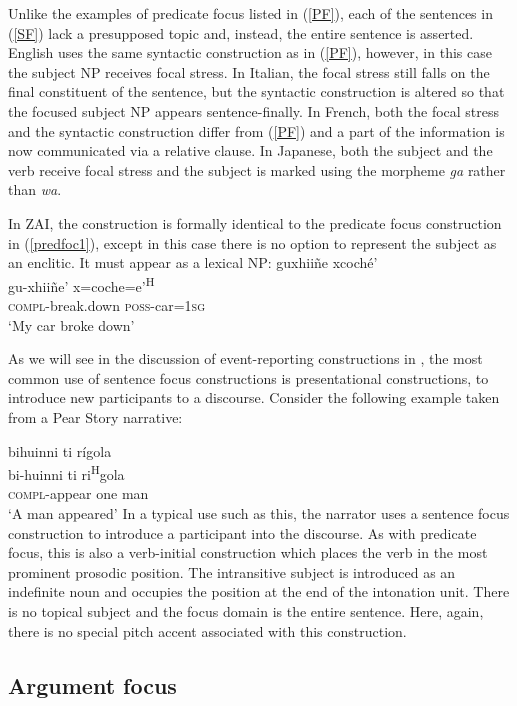 Unlike the examples of predicate focus listed in (\ref{PF}), each of the sentences in (\ref{SF}) lack a presupposed topic and, instead, the entire sentence is asserted. English uses the same syntactic construction as in (\ref{PF}), however, in this case the subject NP receives focal stress. In Italian, the focal stress still falls on the final constituent of the sentence, but the syntactic construction is altered so that the focused subject NP appears sentence-finally. In French, both the focal stress and the syntactic construction differ from (\ref{PF}) and a part of the information is now communicated via a relative clause.  In Japanese, both the subject and the verb receive focal stress and the subject is marked using the morpheme \textit{ga} rather than \textit{wa}.

In ZAI, the construction is formally identical to the predicate focus construction in (\ref{predfoc1}), except in this case there is no option to represent the subject as an enclitic. It must appear as a lexical NP:
\ea 
\glll guxhii\~{n}e xcoch\'{e}' \\
gu-xhii\~{n}e' x=coche=e'\textsuperscript{H} \\
\textsc{compl}-break.down \textsc{poss}-car=\textsc{1sg} \\
\glt `My car broke down'
\z

As we will see in the discussion of event-reporting constructions in , the most common use of sentence focus constructions is presentational constructions, to introduce new participants to a discourse. Consider the following example taken from a Pear Story narrative:

\ea
\glll bihuinni ti r\'{i}gola  \\
bi-huinni ti ri\textsuperscript{H}gola \\
\textsc{compl}-appear one man \\
\glt `A man appeared' 
\z
In a typical use such as this, the narrator uses a sentence focus construction to introduce a participant into the discourse. As with predicate focus, this is also a verb-initial construction which places the verb in the most prominent prosodic position. The intransitive subject is introduced as an indefinite noun and occupies the position at the end of the intonation unit. There is no topical subject and the focus domain is the entire sentence. Here, again, there is no special pitch accent associated with this construction.  


\subsection{Argument focus}\label{afsection}

